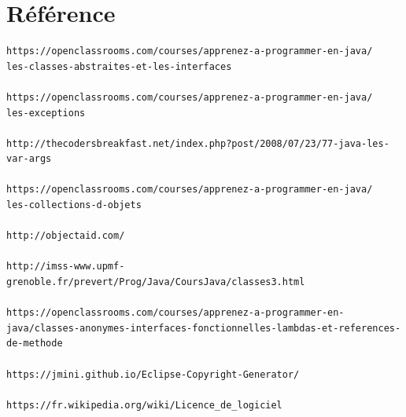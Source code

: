 \documentclass[12pt]{report}
\begin{document}
\newpage
\section{Référence}
\begin{verbatim}
https://openclassrooms.com/courses/apprenez-a-programmer-en-java/
les-classes-abstraites-et-les-interfaces

https://openclassrooms.com/courses/apprenez-a-programmer-en-java/
les-exceptions

http://thecodersbreakfast.net/index.php?post/2008/07/23/77-java-les-var-args

https://openclassrooms.com/courses/apprenez-a-programmer-en-java/
les-collections-d-objets

http://objectaid.com/

http://imss-www.upmf-grenoble.fr/prevert/Prog/Java/CoursJava/classes3.html

https://openclassrooms.com/courses/apprenez-a-programmer-en-java/classes-anonymes-interfaces-fonctionnelles-lambdas-et-references-de-methode

https://jmini.github.io/Eclipse-Copyright-Generator/

https://fr.wikipedia.org/wiki/Licence_de_logiciel
\end{verbatim}
\end{document}
